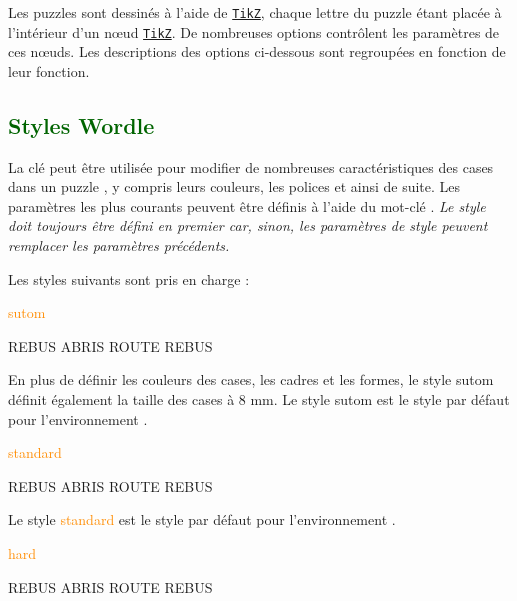 \documentclass[svgnames]{report}
\newcommand\ctan[1]{\href{https://www.ctan.org/pkg/#1}{\texttt{#1}}}
\newcommand\Section[1]{\subsection{\textcolor{DarkGreen}{#1}}}
\begin{document}
  Les puzzles  sont dessinés à l'aide de \ctan{TikZ}, chaque lettre du puzzle étant placée à l'intérieur d'un nœud \ctan{TikZ}. De nombreuses options contrôlent les paramètres de ces nœuds. Les descriptions des options ci-dessous sont regroupées en fonction de leur fonction.

  \Section{Styles Wordle}

  La clé  peut être utilisée pour modifier de nombreuses caractéristiques des cases dans un puzzle , y compris leurs couleurs, les polices et ainsi de suite. Les paramètres les plus courants peuvent être définis à l'aide du mot-clé . \textit{Le style doit toujours être défini en premier car, sinon, les paramètres de style peuvent remplacer les paramètres précédents.}

  Les styles suivants sont pris en charge :

  \textcolor{DarkOrange}{sutom}

  \begin{example}
  \begin{GrilleSutom}[Style=sutom]{REBUS}
    ABRIS
    ROUTE
    REBUS
  \end{GrilleSutom}
  \end{example}

  En plus de définir les couleurs des cases, les cadres et les formes, le style \textsf{sutom} définit également la taille des cases à 8 mm. Le style \textsf{sutom} est le style par défaut pour l'environnement .

  \textcolor{DarkOrange}{standard}

  \begin{example}
  \begin{GrilleSutom}[Style=standard]{REBUS}
    ABRIS
    ROUTE
    REBUS
  \end{GrilleSutom}
  \end{example}

  Le style \textcolor{DarkOrange}{standard} est le style par défaut pour l'environnement .

  \textcolor{DarkOrange}{hard}

  \begin{example}
  \begin{GrilleSutom}[Style=hard]{REBUS}
    ABRIS
    ROUTE
    REBUS
  \end{GrilleSutom}
  \end{example}
\end{document}
